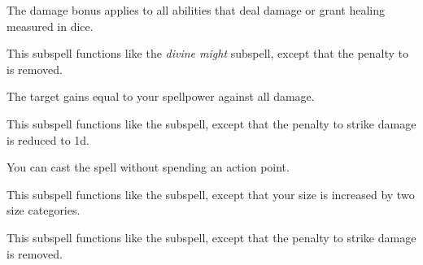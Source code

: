
The damage bonus applies to all abilities that deal damage or grant healing measured in dice.







This subspell functions like the \textit{divine might} subspell, except that the penalty to  is removed.







The target gains  equal to your spellpower against all damage.







This subspell functions like the  subspell, except that the penalty to strike damage is reduced to \minus1d.






You can cast the spell without spending an action point.






This subspell functions like the  subspell, except that your size is increased by two size categories.







This subspell functions like the  subspell, except that the penalty to strike damage is removed.





